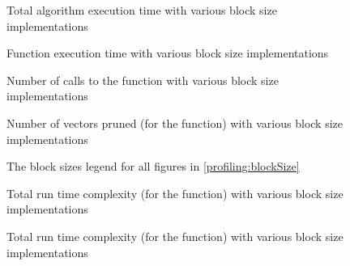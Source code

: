 \begin{figure}
    \centering
    
    \caption{Total algorithm execution time with various block size
        implementations}
    \label{profiling:blockSize:totalExecutionTime}
\end{figure}

\begin{figure}
    \centering
    
    \caption{Function execution time with various block size implementations}
    \label{profiling:blockSize:functionExecutionTime}
\end{figure}

\begin{figure}
    \centering
    
    \caption{Number of calls to the  function with various
        block size implementations}
    \label{profiling:blockSize:distanceCalls}
\end{figure}

\begin{figure}
    \centering
    
    \caption[Number of vectors pruned with various block size implementations]{
        Number of vectors pruned (for the 
        function) with various block size implementations}
    \label{profiling:blockSize:vectorsPruned}
\end{figure}

\begin{figure}
    \centering
    
    \caption[Block size profiling legend]{The block sizes legend for all figures
        in \autoref{profiling:blockSize}}
    \label{profiling:blockSize:legend:block_sizes}
\end{figure}

\begin{figure}
    \centering
    \begin{minipage}{\textwidth}
        \centering
        
        \caption[Total run time complexity with various block size
            implementations (linear)]{Total run time complexity (for the
             function) with various block
            size implementations}
        \label{profiling:blockSize:totalRunTimeComplexity:linear}
    \end{minipage}
    \begin{minipage}{\textwidth}
        \centering
        
        \caption[Total run time complexity with various block size
            implementations (logarithmic)]{Total run time complexity (for the
             function) with various block
            size implementations}
        \label{profiling:blockSize:totalRunTimeComplexity:logarithmic}
    \end{minipage}
\end{figure}

